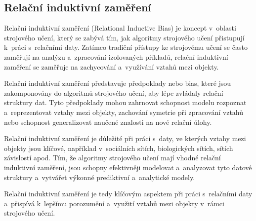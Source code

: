 \subsection{Relační induktivní zaměření}

Relační induktivní zaměření (Relational Inductive Bias) je koncept v~oblasti strojového učení, který se zabývá tím, jak algoritmy strojového učení přistupují k~práci s~relačními daty. Zatímco tradiční přístupy ke strojovému učení se často zaměřují na analýzu a~zpracování izolovaných příkladů, relační induktivní zaměření se zaměřuje na zachycování a~využívání vztahů mezi objekty.

Relační induktivní zaměření představuje předpoklady nebo bias, které jsou zakomponovány do algoritmů strojového učení, aby lépe zvládaly relační struktury dat. Tyto předpoklady mohou zahrnovat schopnost modelu rozpoznat a~reprezentovat vztahy mezi objekty, zachování symetrie při zpracování vztahů nebo schopnost generalizovat naučené znalosti na nové relační úlohy.

Relační induktivní zaměření je důležité při práci s~daty, ve kterých vztahy mezi objekty jsou klíčové, například v~sociálních sítích, biologických sítích, sítích závislostí apod. Tím, že algoritmy strojového učení mají vhodné relační induktivní zaměření, jsou schopny efektivněji modelovat a~analyzovat tyto datové struktury a~vytvářet výkonné prediktivní a~analytické modely.

Relační induktivní zaměření je tedy klíčovým aspektem při práci s~relačními daty a~přispívá k~lepšímu porozumění a~využití vztahů mezi objekty v~rámci strojového učení.
